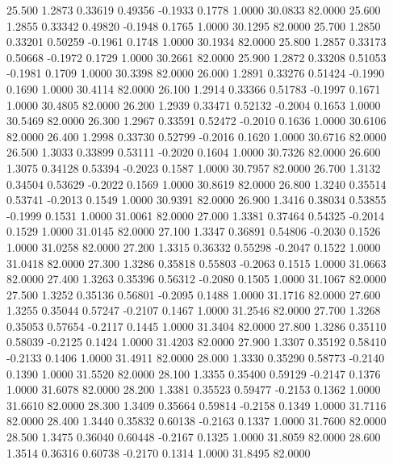   25.500   1.2873   0.33619   0.49356  -0.1933   0.1778   1.0000  30.0833  82.0000
  25.600   1.2855   0.33342   0.49820  -0.1948   0.1765   1.0000  30.1295  82.0000
  25.700   1.2850   0.33201   0.50259  -0.1961   0.1748   1.0000  30.1934  82.0000
  25.800   1.2857   0.33173   0.50668  -0.1972   0.1729   1.0000  30.2661  82.0000
  25.900   1.2872   0.33208   0.51053  -0.1981   0.1709   1.0000  30.3398  82.0000
  26.000   1.2891   0.33276   0.51424  -0.1990   0.1690   1.0000  30.4114  82.0000
  26.100   1.2914   0.33366   0.51783  -0.1997   0.1671   1.0000  30.4805  82.0000
  26.200   1.2939   0.33471   0.52132  -0.2004   0.1653   1.0000  30.5469  82.0000
  26.300   1.2967   0.33591   0.52472  -0.2010   0.1636   1.0000  30.6106  82.0000
  26.400   1.2998   0.33730   0.52799  -0.2016   0.1620   1.0000  30.6716  82.0000
  26.500   1.3033   0.33899   0.53111  -0.2020   0.1604   1.0000  30.7326  82.0000
  26.600   1.3075   0.34128   0.53394  -0.2023   0.1587   1.0000  30.7957  82.0000
  26.700   1.3132   0.34504   0.53629  -0.2022   0.1569   1.0000  30.8619  82.0000
  26.800   1.3240   0.35514   0.53741  -0.2013   0.1549   1.0000  30.9391  82.0000
  26.900   1.3416   0.38034   0.53855  -0.1999   0.1531   1.0000  31.0061  82.0000
  27.000   1.3381   0.37464   0.54325  -0.2014   0.1529   1.0000  31.0145  82.0000
  27.100   1.3347   0.36891   0.54806  -0.2030   0.1526   1.0000  31.0258  82.0000
  27.200   1.3315   0.36332   0.55298  -0.2047   0.1522   1.0000  31.0418  82.0000
  27.300   1.3286   0.35818   0.55803  -0.2063   0.1515   1.0000  31.0663  82.0000
  27.400   1.3263   0.35396   0.56312  -0.2080   0.1505   1.0000  31.1067  82.0000
  27.500   1.3252   0.35136   0.56801  -0.2095   0.1488   1.0000  31.1716  82.0000
  27.600   1.3255   0.35044   0.57247  -0.2107   0.1467   1.0000  31.2546  82.0000
  27.700   1.3268   0.35053   0.57654  -0.2117   0.1445   1.0000  31.3404  82.0000
  27.800   1.3286   0.35110   0.58039  -0.2125   0.1424   1.0000  31.4203  82.0000
  27.900   1.3307   0.35192   0.58410  -0.2133   0.1406   1.0000  31.4911  82.0000
  28.000   1.3330   0.35290   0.58773  -0.2140   0.1390   1.0000  31.5520  82.0000
  28.100   1.3355   0.35400   0.59129  -0.2147   0.1376   1.0000  31.6078  82.0000
  28.200   1.3381   0.35523   0.59477  -0.2153   0.1362   1.0000  31.6610  82.0000
  28.300   1.3409   0.35664   0.59814  -0.2158   0.1349   1.0000  31.7116  82.0000
  28.400   1.3440   0.35832   0.60138  -0.2163   0.1337   1.0000  31.7600  82.0000
  28.500   1.3475   0.36040   0.60448  -0.2167   0.1325   1.0000  31.8059  82.0000
  28.600   1.3514   0.36316   0.60738  -0.2170   0.1314   1.0000  31.8495  82.0000
